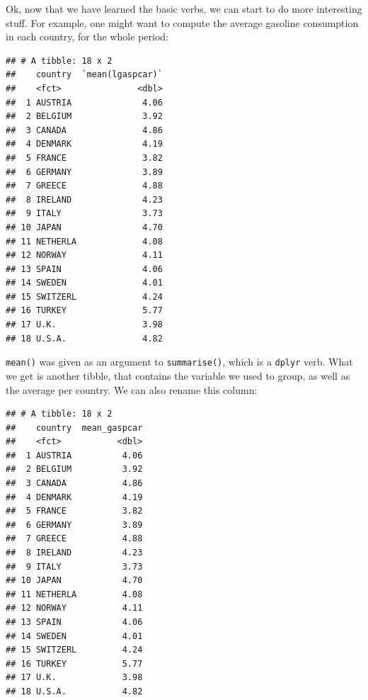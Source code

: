 \documentclass[]{gitbook}
\newenvironment{Shaded}{\begin{snugshade}}{\end{snugshade}}
\newcommand{\DataTypeTok}[1]{\textcolor[rgb]{0.13,0.29,0.53}{#1}}
\newcommand{\KeywordTok}[1]{\textcolor[rgb]{0.13,0.29,0.53}{\textbf{#1}}}
\newcommand{\NormalTok}[1]{#1}
\newcommand{\OperatorTok}[1]{\textcolor[rgb]{0.81,0.36,0.00}{\textbf{#1}}}
\newcommand{\StringTok}[1]{\textcolor[rgb]{0.31,0.60,0.02}{#1}}
\theoremstyle{definition}
\theoremstyle{definition}
\theoremstyle{definition}
\theoremstyle{remark}
\begin{document}
Ok, now that we have learned the basic verbs, we can start to do more
interesting stuff. For example, one might want to compute the average
gasoline consumption in each country, for the whole period:

\begin{Shaded}
\end{Shaded}

\begin{verbatim}
## # A tibble: 18 x 2
##    country  `mean(lgaspcar)`
##    <fct>               <dbl>
##  1 AUSTRIA              4.06
##  2 BELGIUM              3.92
##  3 CANADA               4.86
##  4 DENMARK              4.19
##  5 FRANCE               3.82
##  6 GERMANY              3.89
##  7 GREECE               4.88
##  8 IRELAND              4.23
##  9 ITALY                3.73
## 10 JAPAN                4.70
## 11 NETHERLA             4.08
## 12 NORWAY               4.11
## 13 SPAIN                4.06
## 14 SWEDEN               4.01
## 15 SWITZERL             4.24
## 16 TURKEY               5.77
## 17 U.K.                 3.98
## 18 U.S.A.               4.82
\end{verbatim}

\texttt{mean()} was given as an argument to \texttt{summarise()}, which
is a \texttt{dplyr} verb. What we get is another tibble, that contains
the variable we used to group, as well as the average per country. We
can also rename this column:

\begin{Shaded}
\end{Shaded}

\begin{verbatim}
## # A tibble: 18 x 2
##    country  mean_gaspcar
##    <fct>           <dbl>
##  1 AUSTRIA          4.06
##  2 BELGIUM          3.92
##  3 CANADA           4.86
##  4 DENMARK          4.19
##  5 FRANCE           3.82
##  6 GERMANY          3.89
##  7 GREECE           4.88
##  8 IRELAND          4.23
##  9 ITALY            3.73
## 10 JAPAN            4.70
## 11 NETHERLA         4.08
## 12 NORWAY           4.11
## 13 SPAIN            4.06
## 14 SWEDEN           4.01
## 15 SWITZERL         4.24
## 16 TURKEY           5.77
## 17 U.K.             3.98
## 18 U.S.A.           4.82
\end{verbatim}
\end{document}
